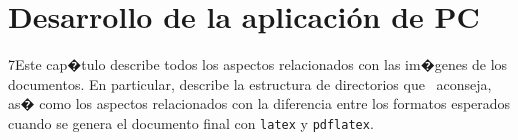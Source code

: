 %
%
%
%
%
%
%
%
%
%

\chapter{Desarrollo de la aplicaci\'on de PC}
\label{cap4}
\label{cap:implementacion}


\begin{FraseCelebre}
\begin{Frase}
\end{Frase}
\begin{Fuente}
\end{Fuente}
\end{FraseCelebre}

\begin{resumen}
7Este cap�tulo describe todos los aspectos relacionados con las
im�genes de los documentos. En particular, describe la estructura de
directorios que \texis\ aconseja, as� como los aspectos
relacionados con la diferencia entre los formatos esperados cuando
se genera el documento final con \texttt{latex} y \texttt{pdflatex}.
\end{resumen}


